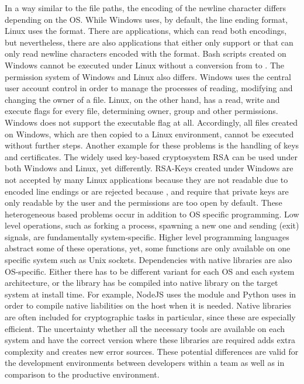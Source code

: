         In a way similar to the file paths, the encoding of the newline character differs depending on the \ac{OS}. While Windows uses, by default, the  line ending format, Linux uses the  format. There are applications, which can read both encodings, but nevertheless, there are also applications that either only support  or that can only read newline characters encoded with the  format. Bash scripts created on Windows cannot be executed under Linux without a conversion from  to . The permission system of Windows and Linux also differs. Windows uses the central user account control in order to manage the processes of reading, modifying and changing the owner of a file. Linux, on the other hand, has a read, write and execute flags for every file, determining owner, group and other permissions. Windows does not support the executable flag at all. Accordingly, all files created on Windows, which are then copied to a Linux environment, cannot be executed without further steps. Another example for these problems is the handling of keys and certificates. The widely used key-based cryptosystem \ac{RSA} can be used under both Windows and Linux, yet differently. \ac{RSA}-Keys created under Windows are not accepted by many Linux applications because they are not readable due to  encoded line endings or are rejected because ,  and  require that private keys are only readable by the user and the permissions are too open by default.\newline
        These heterogeneous based problems occur in addition to \acl{OS} specific programming. Low level operations, such as forking a process, spawning a new one and sending (exit) signals, are fundamentally system-specific. Higher level programming languages abstract some of these operations, yet, some functions are only available on one specific system such as Unix sockets. Dependencies with native libraries are also \acl{OS}-specific. Either there has to be different variant for each \ac{OS} and each system architecture, or the library has be compiled into native library on the target system at install time. For example, NodeJS uses the  module and Python uses  in order to compile native liabilities on the host when it is needed. Native libraries are often included for cryptographic tasks in particular, since these are especially efficient. The uncertainty whether all the necessary tools are available on each system and have the correct version where these libraries are required adds extra complexity and creates new error sources. These potential differences are valid for the development environments between developers within a team as well as in comparison to the productive environment.

